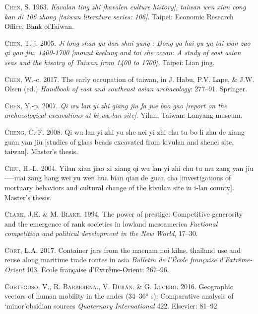 \documentclass[]{article}
\begin{document}
\leavevmode\hypertarget{ref-Chen1963}{}%
\textsc{Chen}, S. 1963. \emph{Kavalan ting zhi {[}kavalen culture
history{]}, taiwan wen xian cong kan di 106 zhong {[}taiwan literature
series: 106{]}}. Taipei: Economic Research Office, Bank ofTaiwan.

\leavevmode\hypertarget{ref-Chen2005}{}%
\textsc{Chen}, T.-j. 2005. \emph{Ji long shan yu dan shui yang : Dong ya
hai yu yu tai wan zao qi yan jiu, 1400-1700 {[}mount keelung and tai she
ocean: A study of east asian seas and the hisotry of Taiwan from 1400 to
1700{]}.} Taipei: Lian jing.

\leavevmode\hypertarget{ref-Chen2017}{}%
\textsc{Chen}, W.-c. 2017. The early occupation of taiwan, in J. Habu,
P.V. Lape, \& J.W. Olsen (ed.) \emph{Handbook of east and southeast
asian archaeology}: 277--91. Springer.

\leavevmode\hypertarget{ref-Chen2007}{}%
\textsc{Chen}, Y.-p. 2007. \emph{Qi wu lan yi zhi qiang jiu fa jue bao
gao {[}report on the archaeological excavations at ki-wu-lan site{]}}.
Yilan, Taiwan: Lanyang museum.

\leavevmode\hypertarget{ref-Cheng2008}{}%
\textsc{Cheng}, C.-F. 2008. Qi wu lan yi zhi yu she nei yi zhi chu tu bo
li zhu de xiang guan yan jiu {[}studies of glass beads excavated from
kivulan and shenei site, taiwan{]}. Master's thesis.

\leavevmode\hypertarget{ref-Chiu2004}{}%
\textsc{Chiu}, H.-L. 2004. Yilan xian jiao xi xiang qi wu lan yi zhi chu
tu mu zang yan jiu ──mai zang hang wei yu wen hua bian qian de guan cha
{[}investigations of mortuary behaviors and cultural change of the
kivulan site in i-lan county{]}. Master's thesis.

\leavevmode\hypertarget{ref-Clark1994}{}%
\textsc{Clark}, J.E. \& M. \textsc{Blake}. 1994. The power of prestige:
Competitive generosity and the emergence of rank societies in lowland
mesoamerica \emph{Factional competition and political development in the
New World}, 17--30.

\leavevmode\hypertarget{ref-Cort2017}{}%
\textsc{Cort}, L.A. 2017. Container jars from the maenam noi kilns,
thailand use and reuse along maritime trade routes in asia
\emph{Bulletin de l'École française d'Extrême-Orient} 103. École
française d'Extrême-Orient: 267--96.

\leavevmode\hypertarget{ref-Cortegoso2016}{}%
\textsc{Cortegoso}, V., R. \textsc{Barberena}., V. \textsc{Durán}. \& G.
\textsc{Lucero}. 2016. Geographic vectors of human mobility in the andes
(34--36° s): Comparative analysis of `minor'obsidian sources
\emph{Quaternary International} 422. Elsevier: 81--92.
\end{document}
